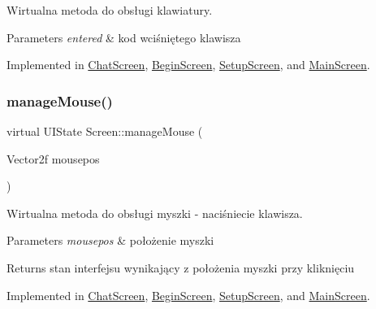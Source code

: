 Wirtualna metoda do obsługi klawiatury. 


\begin{DoxyParams}{Parameters}
{\em entered} & kod wciśniętego klawisza \\
\hline
\end{DoxyParams}


Implemented in \mbox{\hyperlink{class_chat_screen_a1ab966165fc054af7c623e75e66c29c5}{Chat\+Screen}}, \mbox{\hyperlink{class_begin_screen_a7f35b82f9f7ecceb5d45a33298812285}{Begin\+Screen}}, \mbox{\hyperlink{class_setup_screen_ac1b4b500907cf569e58a6a98f082e8d2}{Setup\+Screen}}, and \mbox{\hyperlink{class_main_screen_ac0e2f8d06e1a7fef07d52730b94132d3}{Main\+Screen}}.

\mbox{\label{class_screen_aee89e0a473a855ddd0ae9cd38c5f2529}} 
\subsubsection{\texorpdfstring{manageMouse()}{manageMouse()}}
{\footnotesize\ttfamily virtual U\+I\+State Screen\+::manage\+Mouse (\begin{DoxyParamCaption}\item[{Vector2f}]{mousepos }\end{DoxyParamCaption})\hspace{0.3cm}{\ttfamily [pure virtual]}}



Wirtualna metoda do obsługi myszki -\/ naciśniecie klawisza. 


\begin{DoxyParams}{Parameters}
{\em mousepos} & położenie myszki \\
\hline
\end{DoxyParams}
\begin{DoxyReturn}{Returns}
stan interfejsu wynikający z położenia myszki przy kliknięciu 
\end{DoxyReturn}


Implemented in \mbox{\hyperlink{class_chat_screen_a0367fc37c8e860bc044915b9d8b78682}{Chat\+Screen}}, \mbox{\hyperlink{class_begin_screen_a49b4b67234a8f16d7aa6ba0f0ec982a2}{Begin\+Screen}}, \mbox{\hyperlink{class_setup_screen_a0057c82efae24568d4867558fa66167d}{Setup\+Screen}}, and \mbox{\hyperlink{class_main_screen_a767f261da366524c32b687b4cce0e85c}{Main\+Screen}}.

\mbox{\label{class_screen_a039b9d63b0afafff7af22c26e2d81f5e}} 
